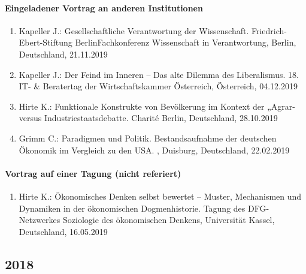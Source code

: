 \paragraph{Eingeladener Vortrag an anderen Institutionen}
\begin{enumerate}
	\item Kapeller J.: Gesellschaftliche Verantwortung der Wissenschaft. Friedrich-Ebert-Stiftung BerlinFachkonferenz Wissenschaft in Verantwortung, Berlin, Deutschland, 21.11.2019
	\item Kapeller J.: Der Feind im Inneren – Das alte Dilemma des Liberalismus. 18. IT- \& Beratertag der Wirtschaftskammer Österreich, Österreich, 04.12.2019
	\item Hirte K.: Funktionale Konstrukte von Bevölkerung im Kontext der „Agrar- versus Industriestaatsdebatte. Charité Berlin, Deutschland, 28.10.2019
	\item Grimm C.: Paradigmen und Politik. Bestandsaufnahme der deutschen Ökonomik im Vergleich zu den USA. , Duisburg, Deutschland, 22.02.2019
\end{enumerate}
\paragraph{Vortrag auf einer Tagung (nicht referiert)}
\begin{enumerate}
	\item Hirte K.: Ökonomisches Denken selbst bewertet – Muster, Mechanismen und Dynamiken in der ökonomischen Dogmenhistorie. Tagung des DFG-Netzwerkes \glqq Soziologie des ökonomischen Denkens\grqq{}, Universität Kassel, Deutschland, 16.05.2019
\end{enumerate}
\subsection*{2018}
